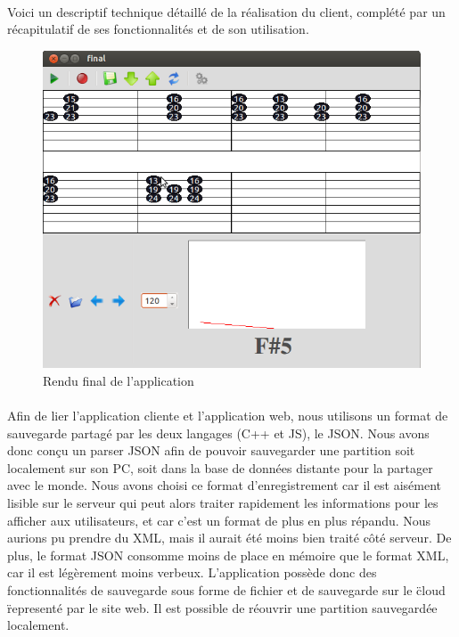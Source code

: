 \paragraph{}
Voici un descriptif technique détaillé de la réalisation du client, complété par un récapitulatif de ses fonctionnalités et de son utilisation.

\begin{figure}[H]
\centering
\includegraphics[scale=0.5]{RenduFinal}
\caption{Rendu final de l'application}
\end{figure}

\paragraph{}
Afin de lier l'application cliente et l'application web, nous utilisons un format de sauvegarde partagé par les deux 
langages (C++ et JS), le JSON. Nous avons donc conçu un parser JSON afin de pouvoir sauvegarder une partition 
soit localement sur son PC, soit dans la base de données distante pour la partager avec le monde. Nous avons choisi 
ce format d'enregistrement car il est aisément lisible sur le serveur qui peut alors traiter rapidement les informations 
pour les afficher aux utilisateurs, et car c'est un format de plus en plus répandu. Nous aurions pu prendre du XML, mais 
il aurait été moins bien traité côté serveur. De plus, le format JSON consomme moins de place en mémoire que le format XML,
car il est légèrement moins verbeux. L'application possède donc des fonctionnalités de sauvegarde sous forme de fichier et 
de sauvegarde sur le \" cloud \"  representé par le site web. Il est possible de réouvrir une partition sauvegardée localement.

